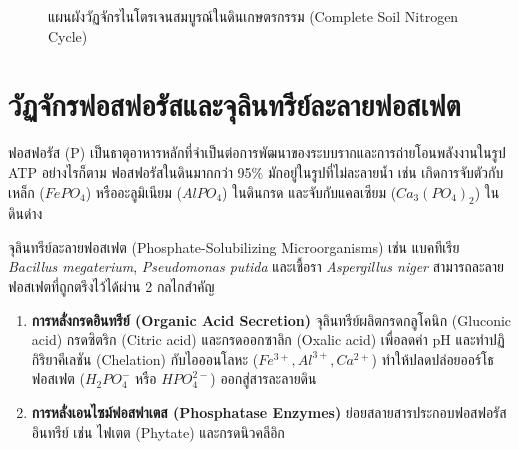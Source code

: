 \begin{figure}[H]
\caption{แผนผังวัฏจักรไนโตรเจนสมบูรณ์ในดินเกษตรกรรม (Complete Soil Nitrogen Cycle)}
\label{fig:nitrogen_cycle}
\end{figure}

\section{วัฏจักรฟอสฟอรัสและจุลินทรีย์ละลายฟอสเฟต}

ฟอสฟอรัส (P) เป็นธาตุอาหารหลักที่จำเป็นต่อการพัฒนาของระบบรากและการถ่ายโอนพลังงานในรูป ATP อย่างไรก็ตาม ฟอสฟอรัสในดินมากกว่า 95\% มักอยู่ในรูปที่ไม่ละลายน้ำ เช่น เกิดการจับตัวกับเหล็ก ($FePO_4$) หรืออะลูมิเนียม ($AlPO_4$) ในดินกรด และจับกับแคลเซียม ($Ca_3(PO_4)_2$) ในดินด่าง

จุลินทรีย์ละลายฟอสเฟต (Phosphate-Solubilizing Microorganisms) เช่น แบคทีเรีย \textit{Bacillus megaterium}, \textit{Pseudomonas putida} และเชื้อรา \textit{Aspergillus niger} สามารถละลายฟอสเฟตที่ถูกตรึงไว้ได้ผ่าน 2 กลไกสำคัญ
\begin{enumerate}
    \item \textbf{การหลั่งกรดอินทรีย์ (Organic Acid Secretion)} จุลินทรีย์ผลิตกรดกลูโคนิก (Gluconic acid) กรดซิตริก (Citric acid) และกรดออกซาลิก (Oxalic acid) เพื่อลดค่า pH และทำปฏิกิริยาคีเลชัน (Chelation) กับไอออนโลหะ ($Fe^{3+}, Al^{3+}, Ca^{2+}$) ทำให้ปลดปล่อยออร์โธฟอสเฟต ($H_2PO_4^-$ หรือ $HPO_4^{2-}$) ออกสู่สารละลายดิน
    \item \textbf{การหลั่งเอนไซม์ฟอสฟาเตส (Phosphatase Enzymes)} ย่อยสลายสารประกอบฟอสฟอรัสอินทรีย์ เช่น ไฟเตต (Phytate) และกรดนิวคลีอิก
\end{enumerate}

